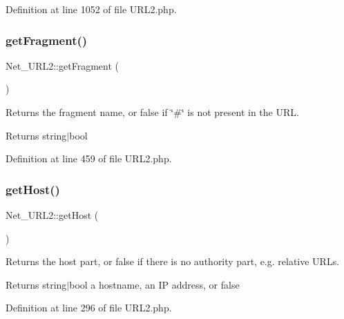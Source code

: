 Definition at line 1052 of file U\+R\+L2.\+php.

\hypertarget{classNet__URL2_a4a72ed5275b63c5cc600a74ec33aa76c}{}\label{classNet__URL2_a4a72ed5275b63c5cc600a74ec33aa76c} 
\subsubsection{\texorpdfstring{get\+Fragment()}{getFragment()}}
{\footnotesize\ttfamily Net\+\_\+\+U\+R\+L2\+::get\+Fragment (\begin{DoxyParamCaption}{ }\end{DoxyParamCaption})}

Returns the fragment name, or false if \char`\"{}\#\char`\"{} is not present in the U\+RL.

\begin{DoxyReturn}{Returns}
string$\vert$bool 
\end{DoxyReturn}


Definition at line 459 of file U\+R\+L2.\+php.

\hypertarget{classNet__URL2_a55343faf36c62fb1942229c00c53e42c}{}\label{classNet__URL2_a55343faf36c62fb1942229c00c53e42c} 
\subsubsection{\texorpdfstring{get\+Host()}{getHost()}}
{\footnotesize\ttfamily Net\+\_\+\+U\+R\+L2\+::get\+Host (\begin{DoxyParamCaption}{ }\end{DoxyParamCaption})}

Returns the host part, or false if there is no authority part, e.\+g. relative U\+R\+Ls.

\begin{DoxyReturn}{Returns}
string$\vert$bool a hostname, an IP address, or false 
\end{DoxyReturn}


Definition at line 296 of file U\+R\+L2.\+php.

\hypertarget{classNet__URL2_ad52ea9577f6cf9ecc712e29498b686d4}{}\label{classNet__URL2_ad52ea9577f6cf9ecc712e29498b686d4} 
